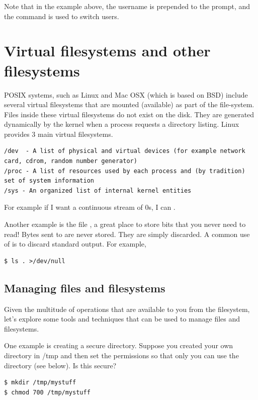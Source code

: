 Note that in the example above, the username is prepended to the prompt, and the command  is used to switch users.

\section{Virtual filesystems and other filesystems}

POSIX systems, such as Linux and Mac OSX (which is based on BSD) include several virtual filesystems that are mounted (available) as part of the file-system.
Files inside these virtual filesystems do not exist on the disk.
They are generated dynamically by the kernel when a process requests a directory listing.
Linux provides 3 main virtual filesystems.

\begin{verbatim}
/dev  - A list of physical and virtual devices (for example network card, cdrom, random number generator)
/proc - A list of resources used by each process and (by tradition) set of system information
/sys - An organized list of internal kernel entities
\end{verbatim}

For example if I want a continuous stream of 0s, I can .

Another example is the file , a great place to store bits that you never need to read!
Bytes sent to  are never stored.
They are simply discarded.
A common use of  is to discard standard output.
For example,

\begin{verbatim}
$ ls . >/dev/null
\end{verbatim}

\subsection{Managing files and filesystems}

Given the multitude of operations that are available to you from the filesystem, let's explore some tools and techniques that can be used to manage files and filesystems.

One example is creating a secure directory.
Suppose you created your own directory in /tmp and then set the permissions so that only you can use the directory (see below).
Is this secure?

\begin{verbatim}
$ mkdir /tmp/mystuff
$ chmod 700 /tmp/mystuff
\end{verbatim}

